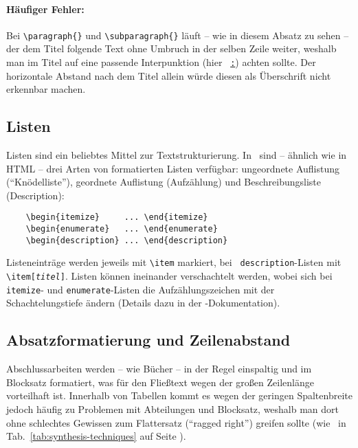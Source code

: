 \paragraph{Häufiger Fehler:} Bei \verb!\paragraph{}! und
\verb!\subparagraph{}! läuft -- wie in diesem Absatz zu sehen --
der dem Titel folgende Text ohne Umbruch in der selben Zeile
weiter, weshalb man im Titel auf eine passende Interpunktion (hier
\zB\ \underline{\texttt{:}}) achten sollte. Der horizontale Abstand
nach dem Titel allein würde diesen als Überschrift nicht erkennbar
machen.


\subsection{Listen}

Listen sind ein beliebtes Mittel zur Textstrukturierung. In
\latex\ sind -- ähnlich wie in HTML -- drei Arten von formatierten
Listen verfügbar: ungeordnete Auflistung ("`Knödelliste"'),
geordnete Auflistung (Aufzählung) und Beschreibungsliste
(Description):
%
\begin{verbatim}
    \begin{itemize}     ... \end{itemize}
    \begin{enumerate}   ... \end{enumerate}
    \begin{description} ... \end{description}
\end{verbatim}
%
Listeneinträge werden jeweils mit \verb!\item! markiert, bei {\tt
description}-Listen mit \verb!\item[!\texttt{\em titel}\verb!]!. Listen
können ineinander verschachtelt werden, wobei sich bei {\tt
itemize}- und \texttt{enumerate}-Listen die Aufzählungszeichen mit
der Schachtelungstiefe ändern (Details dazu in der
\latex-Dokumentation).


\subsection{Absatzformatierung und Zeilenabstand}

Abschlussarbeiten werden -- wie Bücher -- in der Regel einspaltig und
im Blocksatz formatiert, was für den Fließtext wegen der großen
Zeilenlänge vorteilhaft ist. Innerhalb von Tabellen kommt es
wegen der geringen Spaltenbreite jedoch häufig zu Problemen mit
Abteilungen und Blocksatz, weshalb man dort ohne schlechtes
Gewissen zum Flattersatz ("`ragged right"') greifen sollte (wie
\zB\ in Tab.~\ref{tab:synthesis-techniques} auf Seite
\pageref{tab:synthesis-techniques}).

